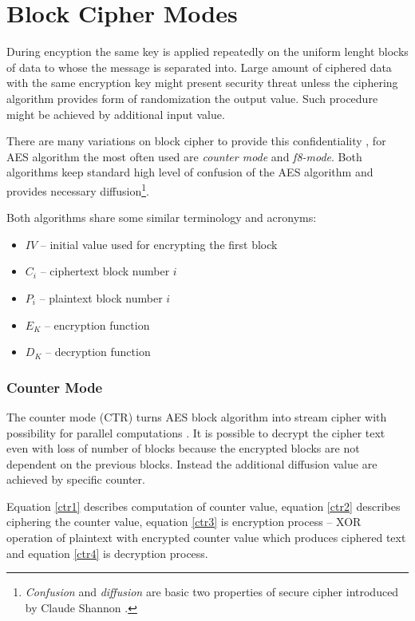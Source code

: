 \section{Block Cipher Modes}
During encyption the same key is applied repeatedly on the uniform lenght blocks
of data to whose the message is separated into. Large amount of ciphered data 
with the same encryption key might present security threat unless the ciphering
algorithm provides form of randomization the output value. Such procedure might
be achieved by additional input value.

There are many variations on block cipher to provide this confidentiality
\cite{blockciphers}, for AES algorithm the most often used are \textit{counter 
mode} and \textit{f8-mode}. Both algorithms keep standard high level of 
confusion of the AES algorithm and provides necessary diffusion\footnote{
\textit{Confusion} and \textit{diffusion} are basic two properties of secure 
cipher introduced by Claude Shannon \cite{shannon}.}.

Both algorithms share some similar terminology and acronyms:
\begin{itemize}
\item $IV$ -- initial value used for encrypting the first block
\item $C_i$ -- ciphertext block number $i$
\item $P_i$ -- plaintext block number $i$
\item $E_K$ -- encryption function
\item $D_K$ -- decryption function
\end{itemize}

\subsubsection*{Counter Mode}
The counter mode (CTR) turns AES block algorithm into stream cipher with 
possibility for parallel computations \cite{parallelctr}. It is possible to 
decrypt the cipher text even with loss of number of blocks because the encrypted
blocks are not dependent on the previous blocks. Instead the additional 
diffusion value are achieved by specific counter. 

Equation \ref{ctr1} describes computation of counter value, equation \ref{ctr2}
describes ciphering the counter value, equation \ref{ctr3} is encryption process
-- XOR operation of plaintext with encrypted counter value which produces 
ciphered text and equation \ref{ctr4} is decryption process.

